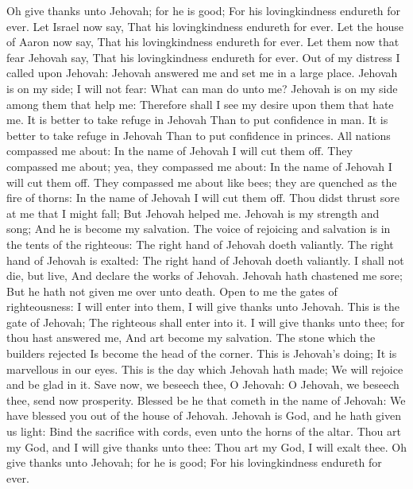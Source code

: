 Oh give thanks unto Jehovah; for he is good; For his lovingkindness endureth for ever.  Let Israel now say, That his lovingkindness endureth for ever.  Let the house of Aaron now say, That his lovingkindness endureth for ever.  Let them now that fear Jehovah say, That his lovingkindness endureth for ever.  Out of my distress I called upon Jehovah: Jehovah answered me and set me in a large place.  Jehovah is on my side; I will not fear: What can man do unto me?  Jehovah is on my side among them that help me: Therefore shall I see my desire upon them that hate me.  It is better to take refuge in Jehovah Than to put confidence in man.  It is better to take refuge in Jehovah Than to put confidence in princes.  All nations compassed me about: In the name of Jehovah I will cut them off.  They compassed me about; yea, they compassed me about: In the name of Jehovah I will cut them off.  They compassed me about like bees; they are quenched as the fire of thorns: In the name of Jehovah I will cut them off.  Thou didst thrust sore at me that I might fall; But Jehovah helped me.  Jehovah is my strength and song; And he is become my salvation.  The voice of rejoicing and salvation is in the tents of the righteous: The right hand of Jehovah doeth valiantly.  The right hand of Jehovah is exalted: The right hand of Jehovah doeth valiantly.  I shall not die, but live, And declare the works of Jehovah.  Jehovah hath chastened me sore; But he hath not given me over unto death.  Open to me the gates of righteousness: I will enter into them, I will give thanks unto Jehovah.  This is the gate of Jehovah; The righteous shall enter into it.  I will give thanks unto thee; for thou hast answered me, And art become my salvation.  The stone which the builders rejected Is become the head of the corner.  This is Jehovah’s doing; It is marvellous in our eyes.  This is the day which Jehovah hath made; We will rejoice and be glad in it.  Save now, we beseech thee, O Jehovah: O Jehovah, we beseech thee, send now prosperity.  Blessed be he that cometh in the name of Jehovah: We have blessed you out of the house of Jehovah.  Jehovah is God, and he hath given us light: Bind the sacrifice with cords, even unto the horns of the altar.  Thou art my God, and I will give thanks unto thee: Thou art my God, I will exalt thee.  Oh give thanks unto Jehovah; for he is good; For his lovingkindness endureth for ever. 

